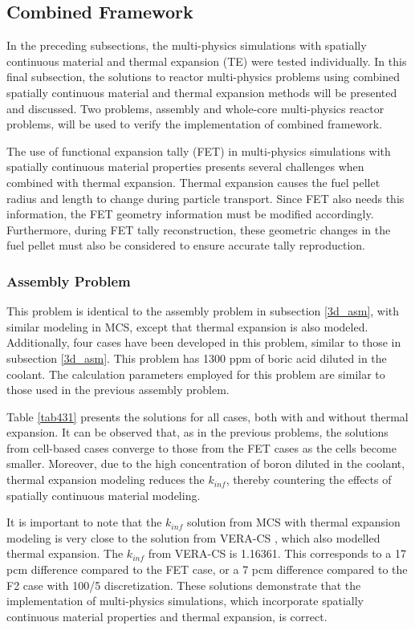 \subsection{Combined Framework} \label{sec43}

In the preceding subsections, the multi-physics simulations with spatially continuous material and thermal expansion (TE) were tested individually. In this final subsection, the solutions to reactor multi-physics problems using combined spatially continuous material and thermal expansion methods will be presented and discussed. Two problems, assembly and whole-core multi-physics reactor problems, will be used to verify the implementation of combined framework.

The use of functional expansion tally (FET) in multi-physics simulations with spatially continuous material properties presents several challenges when combined with thermal expansion. Thermal expansion causes the fuel pellet radius and length to change during particle transport. Since FET also needs this information, the FET geometry information must be modified accordingly. Furthermore, during FET tally reconstruction, these geometric changes in the fuel pellet must also be considered to ensure accurate tally reproduction.

\subsubsection{Assembly Problem}

This problem is identical to the assembly problem in subsection \ref{3d_asm}, with similar modeling in MCS, except that thermal expansion is also modeled. Additionally, four cases have been developed in this problem, similar to those in subsection \ref{3d_asm}. This problem has 1300 ppm of boric acid diluted in the coolant. The calculation parameters employed for this problem are similar to those used in the previous assembly problem.

Table \ref{tab431} presents the solutions for all cases, both with and without thermal expansion. It can be observed that, as in the previous problems, the solutions from cell-based cases converge to those from the FET cases as the cells become smaller. Moreover, due to the high concentration of boron diluted in the coolant, thermal expansion modeling reduces the $k_{inf}$, thereby countering the effects of spatially continuous material modeling.

It is important to note that the $k_{inf}$ solution from MCS with thermal expansion modeling is very close to the solution from VERA-CS \cite{sieger}, which also modelled thermal expansion. The $k_{inf}$ from VERA-CS is 1.16361. This corresponds to a 17 pcm difference compared to the FET case, or a 7 pcm difference compared to the F2 case with 100/5 discretization. These solutions demonstrate that the implementation of multi-physics simulations, which incorporate spatially continuous material properties and thermal expansion, is correct.

